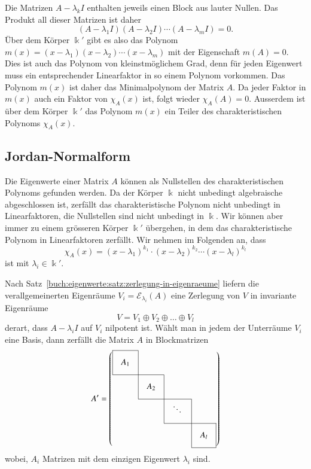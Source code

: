 Die Matrizen $A-\lambda_kI$ enthalten jeweils einen Block aus lauter
Nullen.
Das Produkt all dieser Matrizen  ist daher
\[
(A-\lambda_1I)
(A-\lambda_2I)
\cdots
(A-\lambda_mI)
=
0.
\]
Über dem Körper $\Bbbk'$ gibt es also das Polynom
$m(x)=(x-\lambda_1)(x-\lambda_2)\cdots(x-\lambda_m)$ mit der Eigenschaft
$m(A)=0$.
Dies ist auch das Polynom von kleinstmöglichem Grad, denn für jeden
Eigenwert muss ein entsprechender Linearfaktor in so einem Polynom vorkommen.
Das Polynom $m(x)$ ist daher das Minimalpolynom der Matrix $A$.
%
Da jeder Faktor in $m(x)$ auch ein Faktor von $\chi_A(x)$ ist,
folgt wieder $\chi_A(A)=0$.
Ausserdem ist über dem Körper $\Bbbk'$ das Polynom $m(x)$ ein Teiler
des charakteristischen Polynoms $\chi_A(x)$.

\subsection{Jordan-Normalform
\label{buch:subsection:jordan-normalform}}
%
Die Eigenwerte einer Matrix $A$ können als Nullstellen des 
charakteristischen Polynoms gefunden werden.
Da der Körper $\Bbbk$ nicht unbedingt algebraische abgeschlossen ist,
zerfällt das charakteristische Polynom nicht unbedingt in Linearfaktoren,
die Nullstellen sind nicht unbedingt in $\Bbbk$.
Wir können aber immer zu einem grösseren Körper $\Bbbk'$ übergehen,
in dem das charakteristische Polynom in Linearfaktoren zerfällt.
Wir nehmen im Folgenden an, dass 
\[
\chi_A(x)
=
(x-\lambda_1)^{k_1}
\cdot
(x-\lambda_2)^{k_2}
\cdots
(x-\lambda_l)^{k_l}
\]
ist mit $\lambda_i\in\Bbbk'$.

Nach Satz~\ref{buch:eigenwerte:satz:zerlegung-in-eigenraeume} liefern
die verallgemeinerten Eigenräume $V_i=\mathcal{E}_{\lambda_i}(A)$ eine
Zerlegung von $V$ in invariante Eigenräume
\[
V=V_1\oplus V_2\oplus \dots\oplus V_l
\]
derart, dass $A-\lambda_iI$ auf $V_i$ nilpotent ist.
Wählt man in jedem der Unterräume $V_i$ eine Basis, dann zerfällt die
Matrix $A$ in Blockmatrizen
\begin{equation}
\def\temp#1{\multicolumn{1}{|c}{\raisebox{0pt}[17pt][12pt]{\phantom{x}$#1\mathstrut$}\phantom{x}}}
A'
=\left(
\begin{array}{cccc}
\cline{1-1}
\temp{A_{1}} &\multicolumn{1}{|c}{}&        &           \\
\cline{1-2}
          &\temp{A_{2}}&\multicolumn{1}{|c}{}&           \\
\cline{2-3}
          &           &\temp{\ddots}&\multicolumn{1}{|c}{}\\
\cline{3-4}
          &           &        &\multicolumn{1}{|c|}{\raisebox{0pt}[17pt][12pt]{\phantom{x}$A_{l}$}\phantom{x}}\\
\cline{4-4}
\end{array}
\right)
\label{buch:eigenwerte:eqn:allgjordan}
\end{equation}
wobei, $A_i$ Matrizen mit dem einzigen Eigenwert $\lambda_i$ sind.

